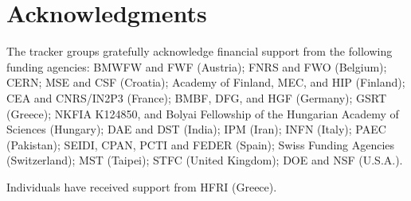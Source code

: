 \section*{Acknowledgments}

The tracker groups gratefully acknowledge financial support from the following funding agencies: BMWFW and FWF (Austria); FNRS and FWO (Belgium); CERN; MSE and CSF (Croatia); Academy of Finland, MEC, and HIP (Finland); CEA and CNRS/IN2P3 (France); BMBF, DFG, and HGF (Germany); GSRT (Greece); NKFIA K124850, and Bolyai Fellowship of the Hungarian Academy of Sciences (Hungary); DAE and DST (India); IPM (Iran); INFN (Italy); PAEC (Pakistan); SEIDI, CPAN, PCTI and FEDER (Spain); Swiss Funding Agencies (Switzerland); MST (Taipei); STFC (United Kingdom); DOE and NSF (U.S.A.).

Individuals have received support from HFRI (Greece).